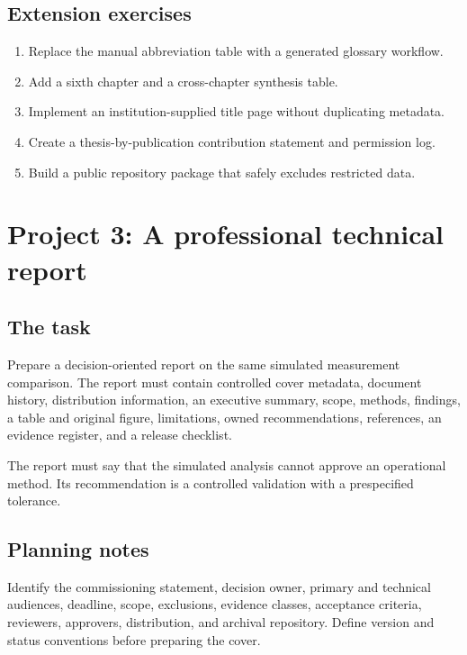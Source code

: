 \subsection{Extension exercises}

\begin{enumerate}
  \item Replace the manual abbreviation table with a generated glossary workflow.
  \item Add a sixth chapter and a cross-chapter synthesis table.
  \item Implement an institution-supplied title page without duplicating metadata.
  \item Create a thesis-by-publication contribution statement and permission log.
  \item Build a public repository package that safely excludes restricted data.
\end{enumerate}

\section{Project 3: A professional technical report}

\subsection{The task}

Prepare a decision-oriented report on the same simulated measurement comparison.
The report must contain controlled cover metadata, document history,
distribution information, an executive summary, scope, methods, findings, a
table and original figure, limitations, owned recommendations, references, an
evidence register, and a release checklist.

The report must say that the simulated analysis cannot approve an operational
method. Its recommendation is a controlled validation with a prespecified
tolerance.

\subsection{Planning notes}

Identify the commissioning statement, decision owner, primary and technical
audiences, deadline, scope, exclusions, evidence classes, acceptance criteria,
reviewers, approvers, distribution, and archival repository. Define version and
status conventions before preparing the cover.


